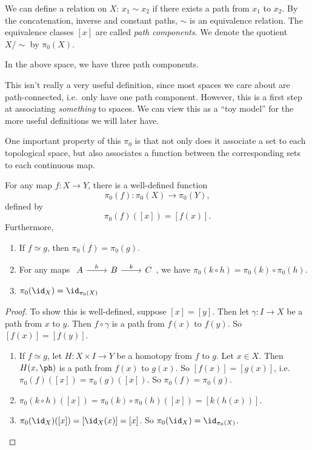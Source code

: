\documentclass[a4paper]{article}
\begin{document}
\begin{defi}
  We can define a relation on $X$: $x_1 \sim x_2$ if there exists a path from $x_1$ to $x_2$. By the concatenation, inverse and constant paths, $\sim$ is an equivalence relation. The equivalence classes $[x]$ are called \emph{path components}. We denote the quotient $X/{\sim}$ by $\pi_0(X)$.
\end{defi}
\begin{center}
\end{center}
In the above space, we have three path components.

This isn't really a very useful definition, since most spaces we care about are path-connected, i.e.\ only have one path component. However, this is a first step at associating \emph{something} to spaces. We can view this as a ``toy model'' for the more useful definitions we will later have.

One important property of this $\pi_0$ is that not only does it associate a set to each topological space, but also associates a function between the corresponding sets to each continuous map.
\begin{prop}
  For any map $f: X\to Y$, there is a well-defined function
  \[
    \pi_0(f): \pi_0(X) \to \pi_0(Y),
  \]
  defined by
  \[
    \pi_0(f)([x]) = [f(x)].
  \]
  Furthermore,
  \begin{enumerate}
    \item If $f\simeq g$, then $\pi_0(f) = \pi_0(g)$.
    \item For any maps $\begin{tikzcd} A \ar[r, "h"] & B\ar[r, "k"] & C\end{tikzcd}$, we have $\pi_0(k\circ h) = \pi_0(k)\circ \pi_0 (h)$.
    \item $\pi_0(\id_X) = \id_{\pi_0(X)}$
  \end{enumerate}
\end{prop}

\begin{proof}
  To show this is well-defined, suppose $[x] = [y]$. Then let $\gamma: I \to X$ be a path from $x$ to $y$. Then $f \circ \gamma$ is a path from $f(x)$ to $f(y)$. So $[f(x)] = [f(y)]$.
  \begin{enumerate}
    \item If $f \simeq g$, let $H: X \times I \to Y$ be a homotopy from $f$ to $g$. Let $x \in X$. Then $H(x, \ph)$ is a path from $f(x)$ to $g(x)$. So $[f(x)] = [g(x)]$, i.e.\ $\pi_0(f)([x]) = \pi_0(g)([x])$. So $\pi_0(f) = \pi_0(g)$.
    \item $\pi_0(k \circ h)([x]) = \pi_0(k) \circ \pi_0(h)([x]) = [k(h(x))]$.
    \item $\pi_0(\id_X)([x]) = [\id_X(x)] = [x]$. So $\pi_0(\id_X) = \id_{\pi_0(X)}$.\qedhere
  \end{enumerate}
\end{proof}
\end{document}
